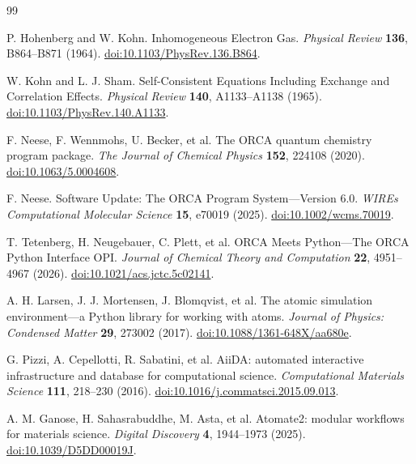 \begin{thebibliography}{99}
  \setlength{\itemsep}{0.25em}

  P. Hohenberg and W. Kohn.
  Inhomogeneous Electron Gas.
  \emph{Physical Review} \textbf{136}, B864--B871 (1964).
  \href{https://doi.org/10.1103/PhysRev.136.B864}{doi:10.1103/PhysRev.136.B864}.

  W. Kohn and L. J. Sham.
  Self-Consistent Equations Including Exchange and Correlation Effects.
  \emph{Physical Review} \textbf{140}, A1133--A1138 (1965).
  \href{https://doi.org/10.1103/PhysRev.140.A1133}{doi:10.1103/PhysRev.140.A1133}.

  F. Neese, F. Wennmohs, U. Becker, et al.
  The ORCA quantum chemistry program package.
  \emph{The Journal of Chemical Physics} \textbf{152}, 224108 (2020).
  \href{https://doi.org/10.1063/5.0004608}{doi:10.1063/5.0004608}.

  F. Neese.
  Software Update: The ORCA Program System---Version 6.0.
  \emph{WIREs Computational Molecular Science} \textbf{15}, e70019 (2025).
  \href{https://doi.org/10.1002/wcms.70019}{doi:10.1002/wcms.70019}.

  T. Tetenberg, H. Neugebauer, C. Plett, et al.
  ORCA Meets Python---The ORCA Python Interface OPI.
  \emph{Journal of Chemical Theory and Computation} \textbf{22}, 4951--4967 (2026).
  \href{https://doi.org/10.1021/acs.jctc.5c02141}{doi:10.1021/acs.jctc.5c02141}.

  A. H. Larsen, J. J. Mortensen, J. Blomqvist, et al.
  The atomic simulation environment---a Python library for working with atoms.
  \emph{Journal of Physics: Condensed Matter} \textbf{29}, 273002 (2017).
  \href{https://doi.org/10.1088/1361-648X/aa680e}{doi:10.1088/1361-648X/aa680e}.

  G. Pizzi, A. Cepellotti, R. Sabatini, et al.
  AiiDA: automated interactive infrastructure and database for computational science.
  \emph{Computational Materials Science} \textbf{111}, 218--230 (2016).
  \href{https://doi.org/10.1016/j.commatsci.2015.09.013}{doi:10.1016/j.commatsci.2015.09.013}.

  A. M. Ganose, H. Sahasrabuddhe, M. Asta, et al.
  Atomate2: modular workflows for materials science.
  \emph{Digital Discovery} \textbf{4}, 1944--1973 (2025).
  \href{https://doi.org/10.1039/D5DD00019J}{doi:10.1039/D5DD00019J}.


\end{thebibliography}
